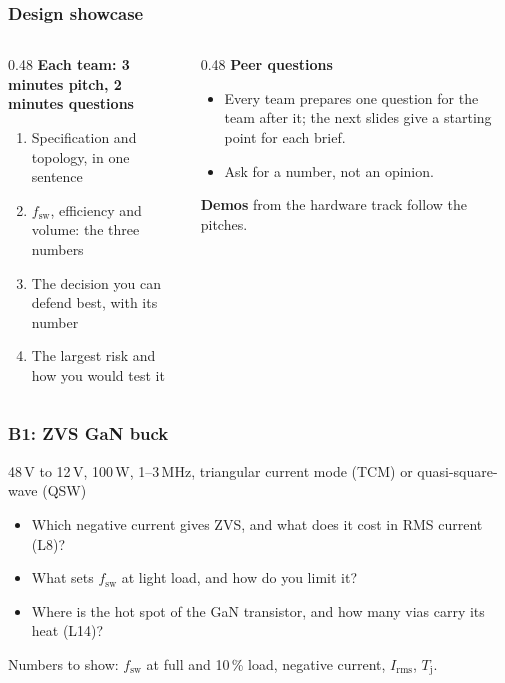 \begin{frame}
	\frametitle{Design showcase}
	\begin{columns}[T]
		\begin{column}{0.48\textwidth}
			\small
			\textbf{Each team: 3 minutes pitch, 2 minutes questions}
			\begin{enumerate}
				\item Specification and topology, in one sentence
				\item $f_\mathrm{sw}$, efficiency and volume: the three numbers
				\item The decision you can defend best, with its number
				\item The largest risk and how you would test it
			\end{enumerate}
		\end{column}
		\begin{column}{0.48\textwidth}
			\small
			\textbf{Peer questions}
			\begin{itemize}
				\item Every team prepares one question for the team after it; the next slides give a starting point for each brief.
				\item Ask for a number, not an opinion.
			\end{itemize}
			\textbf{Demos} from the hardware track follow the pitches.
		\end{column}
	\end{columns}
\end{frame}

\begin{frame}
	\frametitle{B1: ZVS GaN buck}
	\begin{varblock}[\textwidth]{48\,V to 12\,V, 100\,W, 1--3\,MHz, triangular current mode (TCM) or quasi-square-wave (QSW)}
		\begin{itemize}
			\item Which negative current gives ZVS, and what does it cost in RMS current (L8)?
			\item What sets $f_\mathrm{sw}$ at light load, and how do you limit it?
			\item Where is the hot spot of the GaN transistor, and how many vias carry its heat (L14)?
		\end{itemize}
	\end{varblock}
	\small
	Numbers to show: $f_\mathrm{sw}$ at full and 10\,\% load, negative current, $I_\mathrm{rms}$, $T_\mathrm{j}$.
\end{frame}

